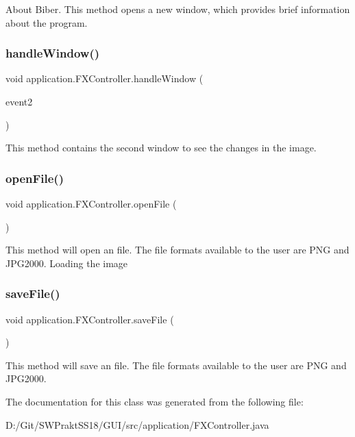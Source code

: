 About Biber. This method opens a new window, which provides brief information about the program. \mbox{\label{classapplication_1_1_f_x_controller_a4ba7818448465dabfafce77571565fb7}} 
\subsubsection{\texorpdfstring{handle\+Window()}{handleWindow()}}
{\footnotesize\ttfamily void application.\+F\+X\+Controller.\+handle\+Window (\begin{DoxyParamCaption}\item[{Action\+Event}]{event2 }\end{DoxyParamCaption})}

This method contains the second window to see the changes in the image. \mbox{\label{classapplication_1_1_f_x_controller_a46a8c8b397699390607ad6bff526d386}} 
\subsubsection{\texorpdfstring{open\+File()}{openFile()}}
{\footnotesize\ttfamily void application.\+F\+X\+Controller.\+open\+File (\begin{DoxyParamCaption}{ }\end{DoxyParamCaption})}

This method will open an file. The file formats available to the user are P\+NG and J\+P\+G2000. Loading the image\mbox{\label{classapplication_1_1_f_x_controller_af9d560a93b56e46e95d267e0e4b205a2}} 
\subsubsection{\texorpdfstring{save\+File()}{saveFile()}}
{\footnotesize\ttfamily void application.\+F\+X\+Controller.\+save\+File (\begin{DoxyParamCaption}{ }\end{DoxyParamCaption})}

This method will save an file. The file formats available to the user are P\+NG and J\+P\+G2000. 

The documentation for this class was generated from the following file\+:\begin{DoxyCompactItemize}
\item 
D\+:/\+Git/\+S\+W\+Prakt\+S\+S18/\+G\+U\+I/src/application/F\+X\+Controller.\+java\end{DoxyCompactItemize}

